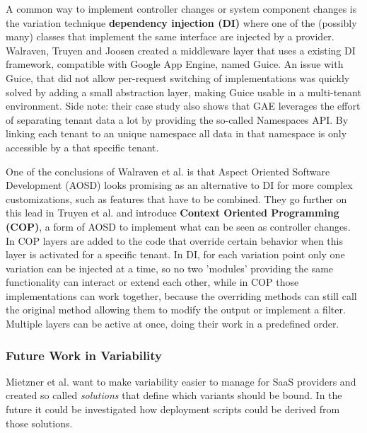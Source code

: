 A common way to implement controller changes or system component changes is the variation technique \textbf{dependency injection (DI)} where one of the (possibly many) classes that implement the same interface are injected by a provider. 
Walraven, Truyen and Joosen \cite{walraven2011middleware} created a middleware layer that uses a existing DI framework, compatible with Google App Engine, named Guice. An issue with Guice, that did not allow per-request switching of implementations was quickly solved by adding a small abstraction layer, making Guice usable in a multi-tenant environment.
Side note: their case study also shows that GAE leverages the effort of separating tenant data a lot by providing the so-called Namespaces API. By linking each tenant to an unique namespace all data in that namespace is only accessible by a that specific tenant.

One of the conclusions of Walraven et al. is that Aspect Oriented Software Development (AOSD) looks promising as an alternative to DI for more complex customizations, such as features that have to be combined.
They go further on this lead in Truyen et al. \cite{truyen2012context} and introduce \textbf{Context Oriented Programming (COP)}, a form of AOSD to implement what can be seen as controller changes. 
In COP layers are added to the code that override certain behavior when this layer is activated for a specific tenant. 
In DI, for each variation point only one variation can be injected at a time, so no two 'modules' providing the same functionality can interact or extend each other, while in COP those implementations can work together, because the overriding methods can still call the original method allowing them to modify the output or implement a filter. 
Multiple layers can be active at once, doing their work in a predefined order. 

\subsubsection{Future Work in Variability}

Mietzner et al. \cite{mietzner2008defining} want to make variability easier to manage for SaaS providers and created so called \textit{solutions} that define which variants should be bound. In the future it could be investigated how deployment scripts could be derived from those solutions.

